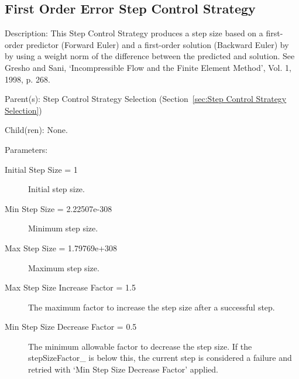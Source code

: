 \begin{list}{}
\end{list}

\subsection{First Order Error Step Control Strategy}
\label{sec:First Order Error Step Control Strategy}

\begin{list}{}
  {\setlength{\leftmargin}{1.0in}
   \setlength{\labelwidth}{0.75in}
   \setlength{\labelsep}{0.125in}}
  \item[Description:]
    This Step Control Strategy produces a step size based on a first-order predictor (Forward Euler) and a first-order solution (Backward Euler) by by using a weight norm of the difference between the predicted and solution.  See Gresho and Sani, `Incompressible Flow and the Finite Element Method', Vol. 1, 1998, p. 268.
  \item[Parent(s):]
    Step Control Strategy Selection (Section~\ref{sec:Step Control Strategy Selection})
  \item[Child(ren):]
    None. 
  \item[Parameters:]
    \begin{description}
      \item[Initial Step Size = 1] 
Initial step size.
      \item[Min Step Size = 2.22507e-308] 
Minimum step size.
      \item[Max Step Size = 1.79769e+308] 
Maximum step size.
      \item[Max Step Size Increase Factor = 1.5] 
The maximum factor to increase the step size after a successful step.
      \item[Min Step Size Decrease Factor = 0.5] 
The minimum allowable factor to decrease the step size.  If the stepSizeFactor\_ is below this, the current step is considered a failure and retried with `Min Step Size Decrease Factor' applied.

\end{description}
\end{list}
